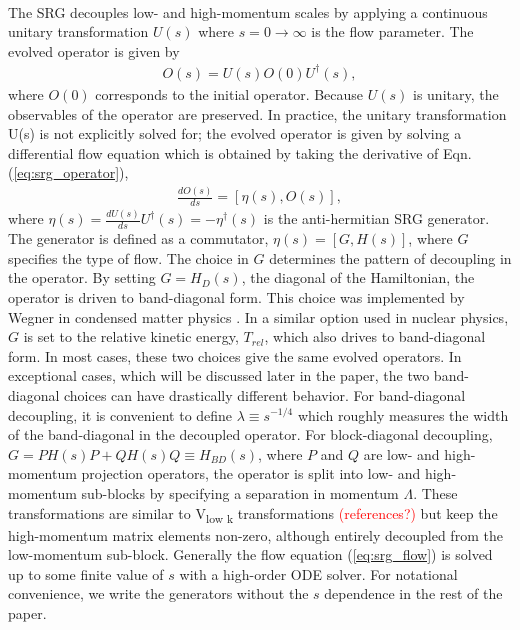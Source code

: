 \documentclass[preprintnumbers,floatfix,aps,prc,preprint,nofootinbib]{revtex4-1}
\begin{document}
\\
The SRG decouples low- and high-momentum scales by applying a continuous unitary transformation $U(s)$ where $s=0 \rightarrow \infty$ is the flow parameter. The evolved operator is given by
%
\begin{eqnarray}
	\label{eq:srg_operator}
	O(s) = U(s) O(0) U^{\dagger}(s),
\end{eqnarray}
%
where $O(0)$ corresponds to the initial operator. Because $U(s)$ is unitary, the observables of the operator are preserved. In practice, the unitary transformation U(s) is not explicitly solved for; the evolved operator is given by solving a differential flow equation which is obtained by taking the derivative of Eqn. (\ref{eq:srg_operator}),
%
\begin{eqnarray}
	\label{eq:srg_flow}
	\frac{dO(s)}{ds} = [\eta(s), O(s)],
\end{eqnarray}
%
where $\eta(s)=\frac{dU(s)}{ds} U^{\dagger}(s) = -\eta^{\dagger}(s)$ is the anti-hermitian SRG generator. The generator is defined as a commutator, $\eta(s) = [G, H(s)]$, where $G$ specifies the type of flow. The choice in $G$ determines the pattern of decoupling in the operator. By setting $G=H_D(s)$, the diagonal of the Hamiltonian, the operator is driven to band-diagonal form. This choice was implemented by Wegner in condensed matter physics \cite{Wegner:1994ab}. In a similar option used in nuclear physics, $G$ is set to the relative kinetic energy, $T_{rel}$, which also drives to band-diagonal form. In most cases, these two choices give the same evolved operators. In exceptional cases, which will be discussed later in the paper, the two band-diagonal choices can have drastically different behavior. For band-diagonal decoupling, it is convenient to define $\lambda \equiv s^{-1/4}$ which roughly measures the width of the band-diagonal in the decoupled operator. For block-diagonal decoupling, $G=P H(s) P + Q H(s) Q \equiv H_{BD}(s)$, where $P$ and $Q$ are low- and high-momentum projection operators, the operator is split into low- and high-momentum sub-blocks by specifying a separation in momentum $\Lambda$. These transformations are similar to V\textsubscript{low k} transformations \textcolor{red}{(references?)} but keep the high-momentum matrix elements non-zero, although entirely decoupled from the low-momentum sub-block. Generally the flow equation (\ref{eq:srg_flow}) is solved up to some finite value of $s$ with a high-order ODE solver. For notational convenience, we write the generators without the $s$ dependence in the rest of the paper.
\\
\end{document}
